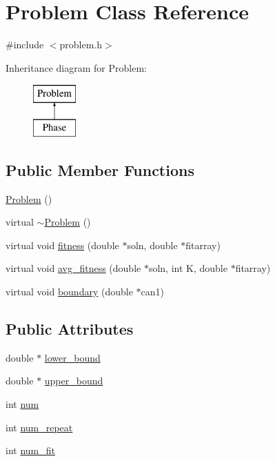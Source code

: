 \hypertarget{class_problem}{}\section{Problem Class Reference}
\label{class_problem}


{\ttfamily \#include $<$problem.\+h$>$}

Inheritance diagram for Problem\+:\begin{figure}[H]
\begin{center}
\leavevmode
\includegraphics[height=2.000000cm]{class_problem}
\end{center}
\end{figure}
\subsection*{Public Member Functions}
\begin{DoxyCompactItemize}
\item 
\hyperlink{class_problem_ad9d44f0ef936fb62f0ce41dd200494ac}{Problem} ()
\item 
virtual \hyperlink{class_problem_af175051c1f08660690573aa0021e4106}{$\sim$\+Problem} ()
\item 
virtual void \hyperlink{class_problem_a0109e1edec5b5b0fa682c5037132c308}{fitness} (double $\ast$soln, double $\ast$fitarray)
\item 
virtual void \hyperlink{class_problem_a5a889257574b59d70c30e77f96657633}{avg\+\_\+fitness} (double $\ast$soln, int K, double $\ast$fitarray)
\item 
virtual void \hyperlink{class_problem_a866551d6c3a8c639eed39dd629459145}{boundary} (double $\ast$can1)
\end{DoxyCompactItemize}
\subsection*{Public Attributes}
\begin{DoxyCompactItemize}
\item 
double $\ast$ \hyperlink{class_problem_a4dfde0675e59264970f418516b799b2c}{lower\+\_\+bound}
\item 
double $\ast$ \hyperlink{class_problem_a02bd6d1e098e211cc3bf0f5e02f20133}{upper\+\_\+bound}
\item 
int \hyperlink{class_problem_ae46e65561288cc81f06c2ddae062d303}{num}
\item 
int \hyperlink{class_problem_a02dc7cd36750260516f536d4b519399d}{num\+\_\+repeat}
\item 
int \hyperlink{class_problem_a11dbb1d5a91b82ac8bab777362003e43}{num\+\_\+fit}
\end{DoxyCompactItemize}


